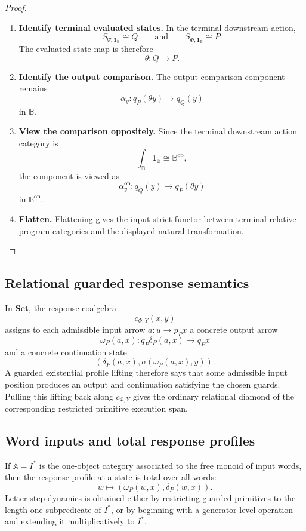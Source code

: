 \begin{proof}
\leavevmode
\begin{enumerate}
\item \textbf{Identify terminal evaluated states.}
In the terminal downstream action,
\[
S_{\Psi,\mathbf 1_{\mathbb B}}\cong Q
\qquad\text{and}\qquad
S_{\Phi,\mathbf 1_{\mathbb B}}\cong P.
\]
The evaluated state map is therefore
\[
\theta:Q\to P.
\]

\item \textbf{Identify the output comparison.}
The output-comparison component remains
\[
\alpha_y:q_P(\theta y)\to q_Q(y)
\]
in \(\mathbb B\).

\item \textbf{View the comparison oppositely.}
Since the terminal downstream action category is
\[
\int_{\mathbb B}\mathbf 1_{\mathbb B}\cong\mathbb B^{\mathrm{op}},
\]
the component is viewed as
\[
\alpha_y^{\mathrm{op}}:
q_Q(y)\to q_P(\theta y)
\]
in \(\mathbb B^{\mathrm{op}}\).

\item \textbf{Flatten.}
Flattening gives the input-strict functor between terminal relative program
categories and the displayed natural transformation.
\end{enumerate}
\end{proof}

\subsection{Relational guarded response semantics}
\label{subsec:poly-relative-example-relational}

In \(\mathbf{Set}\), the response coalgebra
\[
c_{\Phi,Y}(x,y)
\]
assigns to each admissible input arrow \(a:u\to p_Px\) a concrete output arrow
\[
\omega_P(a,x):q_P\delta_P(a,x)\to q_Px
\]
and a concrete continuation state
\[
(\delta_P(a,x),\sigma(\omega_P(a,x),y)).
\]
A guarded existential profile lifting therefore says that some admissible
input position produces an output and continuation satisfying the chosen
guards.  Pulling this lifting back along \(c_{\Phi,Y}\) gives the ordinary
relational diamond of the corresponding restricted primitive execution span.

\subsection{Word inputs and total response profiles}
\label{subsec:poly-relative-example-words}

If \(\mathbb A=I^\ast\) is the one-object category associated to the free
monoid of input words, then the response profile at a state is total over all
words:
\[
w\longmapsto
\left(
\omega_P(w,x),
\delta_P(w,x)
\right).
\]
Letter-step dynamics is obtained either by restricting guarded primitives to
the length-one subpredicate of \(I^\ast\), or by beginning with a generator-level
operation and extending it multiplicatively to \(I^\ast\).


